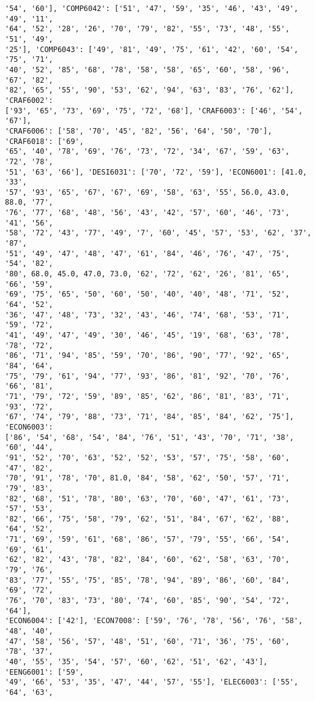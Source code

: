 \documentclass[11pt]{article}
\begin{document}
\begin{Verbatim}[commandchars=\\\{\}]
'54', '60'], 'COMP6042': ['51', '47', '59', '35', '46', '43', '49', '49', '11',
'64', '52', '28', '26', '70', '79', '82', '55', '73', '48', '55', '51', '49',
'25'], 'COMP6043': ['49', '81', '49', '75', '61', '42', '60', '54', '75', '71',
'40', '52', '85', '68', '78', '58', '58', '65', '60', '58', '96', '67', '82',
'82', '65', '55', '90', '53', '62', '94', '63', '83', '76', '62'], 'CRAF6002':
['93', '65', '73', '69', '75', '72', '68'], 'CRAF6003': ['46', '54', '67'],
'CRAF6006': ['58', '70', '45', '82', '56', '64', '50', '70'], 'CRAF6018': ['69',
'65', '40', '78', '69', '76', '73', '72', '34', '67', '59', '63', '72', '78',
'51', '63', '66'], 'DESI6031': ['70', '72', '59'], 'ECON6001': [41.0, '33',
'57', '93', '65', '67', '67', '69', '58', '63', '55', 56.0, 43.0, 88.0, '77',
'76', '77', '68', '48', '56', '43', '42', '57', '60', '46', '73', '41', '56',
'58', '72', '43', '77', '49', '7', '60', '45', '57', '53', '62', '37', '87',
'51', '49', '47', '48', '47', '61', '84', '46', '76', '47', '75', '54', '82',
'80', 68.0, 45.0, 47.0, 73.0, '62', '72', '62', '26', '81', '65', '66', '59',
'69', '75', '65', '50', '60', '50', '40', '40', '48', '71', '52', '64', '52',
'36', '47', '48', '73', '32', '43', '46', '74', '68', '53', '71', '59', '72',
'41', '49', '47', '49', '30', '46', '45', '19', '68', '63', '78', '78', '72',
'86', '71', '94', '85', '59', '70', '86', '90', '77', '92', '65', '84', '64',
'75', '79', '61', '94', '77', '93', '86', '81', '92', '70', '76', '66', '81',
'71', '79', '72', '59', '89', '85', '62', '86', '81', '83', '71', '93', '72',
'67', '74', '79', '88', '73', '71', '84', '85', '84', '62', '75'], 'ECON6003':
['86', '54', '68', '54', '84', '76', '51', '43', '70', '71', '38', '60', '44',
'91', '52', '70', '63', '52', '52', '53', '57', '75', '58', '60', '47', '82',
'70', '91', '78', '70', 81.0, '84', '58', '62', '50', '57', '71', '79', '83',
'82', '68', '51', '78', '80', '63', '70', '60', '47', '61', '73', '57', '53',
'82', '66', '75', '58', '79', '62', '51', '84', '67', '62', '88', '64', '52',
'71', '69', '59', '61', '68', '86', '57', '79', '55', '66', '54', '69', '61',
'62', '82', '43', '78', '82', '84', '60', '62', '58', '63', '70', '79', '76',
'83', '77', '55', '75', '85', '78', '94', '89', '86', '60', '84', '69', '72',
'76', '70', '83', '73', '80', '74', '60', '85', '90', '54', '72', '64'],
'ECON6004': ['42'], 'ECON7008': ['59', '76', '78', '56', '76', '58', '48', '40',
'47', '58', '56', '57', '48', '51', '60', '71', '36', '75', '60', '78', '37',
'40', '55', '35', '54', '57', '60', '62', '51', '62', '43'], 'EENG6001': ['59',
'49', '66', '53', '35', '47', '44', '57', '55'], 'ELEC6003': ['55', '64', '63',

\end{Verbatim}
\end{document}
